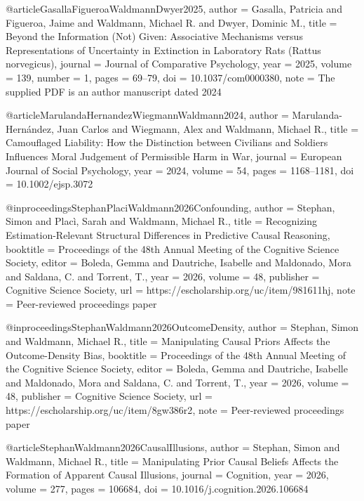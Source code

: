 @article{GasallaFigueroaWaldmannDwyer2025,
  author  = {Gasalla, Patricia and Figueroa, Jaime and Waldmann, Michael R. and Dwyer, Dominic M.},
  title   = {Beyond the Information (Not) Given: Associative Mechanisms versus Representations of Uncertainty in Extinction in Laboratory Rats ({Rattus norvegicus})},
  journal = {Journal of Comparative Psychology},
  year    = {2025},
  volume  = {139},
  number  = {1},
  pages   = {69--79},
  doi     = {10.1037/com0000380},
  note    = {The supplied PDF is an author manuscript dated 2024}
}

@article{MarulandaHernandezWiegmannWaldmann2024,
  author  = {Marulanda-Hern{\'a}ndez, Juan Carlos and Wiegmann, Alex and Waldmann, Michael R.},
  title   = {Camouflaged Liability: How the Distinction between Civilians and Soldiers Influences Moral Judgement of Permissible Harm in War},
  journal = {European Journal of Social Psychology},
  year    = {2024},
  volume  = {54},
  pages   = {1168--1181},
  doi     = {10.1002/ejsp.3072}
}

@inproceedings{StephanPlaciWaldmann2026Confounding,
  author    = {Stephan, Simon and Plac{\`i}, Sarah and Waldmann, Michael R.},
  title     = {Recognizing Estimation-Relevant Structural Differences in Predictive Causal Reasoning},
  booktitle = {Proceedings of the 48th Annual Meeting of the Cognitive Science Society},
  editor    = {Boleda, Gemma and Dautriche, Isabelle and Maldonado, Mora and Saldana, C. and Torrent, T.},
  year      = {2026},
  volume    = {48},
  publisher = {Cognitive Science Society},
  url       = {https://escholarship.org/uc/item/981611hj},
  note      = {Peer-reviewed proceedings paper}
}

@inproceedings{StephanWaldmann2026OutcomeDensity,
  author    = {Stephan, Simon and Waldmann, Michael R.},
  title     = {Manipulating Causal Priors Affects the Outcome-Density Bias},
  booktitle = {Proceedings of the 48th Annual Meeting of the Cognitive Science Society},
  editor    = {Boleda, Gemma and Dautriche, Isabelle and Maldonado, Mora and Saldana, C. and Torrent, T.},
  year      = {2026},
  volume    = {48},
  publisher = {Cognitive Science Society},
  url       = {https://escholarship.org/uc/item/8gw386r2},
  note      = {Peer-reviewed proceedings paper}
}

@article{StephanWaldmann2026CausalIllusions,
  author  = {Stephan, Simon and Waldmann, Michael R.},
  title   = {Manipulating Prior Causal Beliefs Affects the Formation of Apparent Causal Illusions},
  journal = {Cognition},
  year    = {2026},
  volume  = {277},
  pages   = {106684},
  doi     = {10.1016/j.cognition.2026.106684}
}

